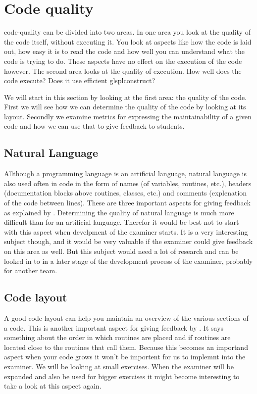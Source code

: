 \section{Code quality}

\Gls{code-quality} can be divided into two areas.
In one area you look at the quality of the \gls{code} itself,
without executing it.
You look at aspects like how the \gls{code} is laid out,
how easy it is to read the \gls{code}
and how well you can understand what the \gls{code} is trying to do.
These aspects have no effect on the execution of the \gls{code} however.
The second area looks at the quality of execution. How well
does the \gls{code} execute? Does it use efficient glspl{construct}?

We will start in this section by looking at the first area:
the quality of the \gls{code}.
First we will see how we can determine the quality of the \gls{code}
by looking at its layout.
Secondly we examine metrics for expressing the \gls{maintainability}
of a given \gls{code} and how we can use that
to give \gls{feedback} to \glspl{student}.

\subsection{Natural Language}

Allthough a programming language is an artificial language,
natural language is also used often in code in the form of
names (of variables, routines, etc.),
headers (documentation blocks above routines, classes, etc.)
and comments (explenation of the code between lines).
These are three important aspects for giving \gls{feedback}
as explained by \citet{stegeman2014empirically}.
Determining the quality of natural language is much more difficult
than for an artificial language.
Therefor it would be best not to start with this aspect
when develpment of the \gls{examiner} starts.
It is a very interesting subject though,
and it would be very valuable if the \gls{examiner} could give \gls{feedback}
on this area as well.
But this subject would need a lot of research and can be looked in to
in a later stage of the development process of the \gls{examiner},
probably for another team.

\subsection{Code layout}

A good \Gls{code-layout} can help you maintain an overview
of the various sections of a \gls{code}.
This is another important aspect for giving feedback
by \citet{stegeman2014empirically}.
It says something about the order in which routines are placed
and if routines are located close to the routines that call them.
Because this becomes an importand aspect when your \gls{code} grows
it won't be importent for us to implemnt into the \gls{examiner}.
We will be looking at small \glspl{exercise}.
When the \gls{examiner} will be expanded
and also be used for bigger \glspl{exercise}
it might become interesting to take a look at this aspect again.

